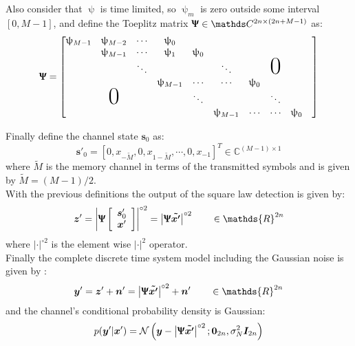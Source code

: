 Also consider that $\uppsi$ is time limited, so $\uppsi_m$ is zero outside some interval $[0,M-1]$, and define the Toeplitz matrix
$\bm \Uppsi \in\mathds C^{2n\times(2n+M-1)}$ as:
\begin{equation}
	\bm \Uppsi = \begin{bmatrix}
				\uppsi_{M-1}&\uppsi_{M-2}&\cdots &\uppsi_0&&&\\
				&\uppsi_{M-1}&\cdots &\uppsi_1&\uppsi_0&&\\
				&&\ddots&&&\ddots&&\mbox{\Huge 0}&\\
				&&&\uppsi_{M-1}&\cdots&\cdots&\uppsi_0&\\
				&\mbox{\Huge 0}&&&\ddots&&&\ddots&&\\
				&&&&&\uppsi_{M-1}&\cdots&\cdots&\uppsi_0&\\
			     \end{bmatrix}
\end{equation}

Finally define the channel state $\bm s_0$ as:
\begin{equation}
\bm{s}'_0=[0,x_{-\widetilde{M}},0,x_{1-\widetilde{M}},\cdots,0,x_{-1}]^T \in \mathds{C}^{(M-1)\times1}
\end{equation}
where $\widetilde{M}$ is the memory channel in terms of the transmitted symbols and is given by $\widetilde{M}=(M-1)/2$.\\


With the previous definitions the output of the square law detection is given by:
\begin{align*}
	\bm z' = \left|\bm \Uppsi \left[
\begin{array}{c}
\bm{s}'_0  \\
   \bm x'
\end{array}
\right]
\right|^{\circ2} = \left|\bm{ \Uppsi \tilde{x'}}\right|^{\circ2} \qquad \in\mathds{R}^{2n}
\end{align*}
where $|\cdot|^{\circ2}$ is the element wise $|\cdot|^2$ operator.\\

Finally  the complete discrete time system model including the Gaussian noise is given by \cite{Plabst_DD}:
\begin{align*}
	\bm y' = \bm z' + \bm n' = \left|\bm{ \Uppsi \tilde{x'}}\right|^{\circ2} +\bm n' \qquad \in \mathds{R}^{2n}
\end{align*}
and the channel’s conditional probability density is Gaussian\cite{Plabst_DD}:
\begin{equation}
p(\bm y'|\bm x')=\mathcal N \left( \bm y- \left|\bm{ \Uppsi \tilde{x'}}\right|^{\circ2}; \bm 0_{2n} , \sigma_N^2 \bm I_{2n}  \right)
\end{equation}


